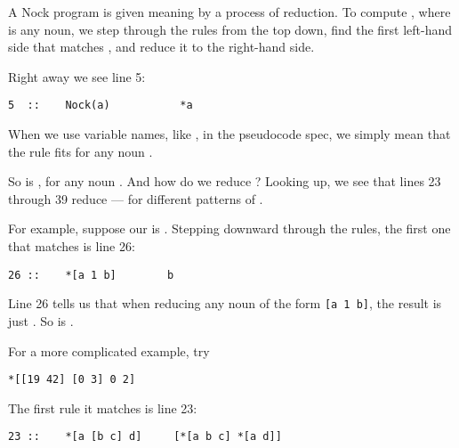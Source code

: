 A Nock program is given meaning by a process of reduction.  To compute
, where  is any noun, we step through the rules from
the top down, find the first left-hand side that matches , and
reduce it to the right-hand side.

Right away we see line 5:

\begin{framed_shaded}
\begin{Verbatim}[fontsize=\relsize{-2.5},fontseries=b,commandchars=\\\{\}]
5  ::    Nock(a)           *a
\end{Verbatim}
\end{framed_shaded}

When we use variable names, like , in the pseudocode spec, we
simply mean that the rule fits for any noun .

So  is , for any noun .  And how do we reduce
?  Looking up, we see that lines 23 through 39 reduce ---
for different patterns of .

For example, suppose our  is \kode{[5 1 6]}.  Stepping downward
through the rules, the first one that matches is line 26:

\begin{framed_shaded}
\begin{Verbatim}[fontsize=\relsize{-2.5},fontseries=b,commandchars=\\\{\}]
26 ::    *[a 1 b]        b
\end{Verbatim}
\end{framed_shaded}

Line 26 tells us that when reducing any noun of the form {\tt [a 1
b]}, the result is just .  So \kode{*[5 1 6]} is .

For a more complicated example, try

\begin{framed_shaded}
\begin{Verbatim}[fontsize=\relsize{-2.5},fontseries=b,commandchars=\\\{\}]
*[[19 42] [0 3] 0 2]
\end{Verbatim}
\end{framed_shaded}

The first rule it matches is line 23:

\begin{framed_shaded}
\begin{Verbatim}[fontsize=\relsize{-2.5},fontseries=b,commandchars=\\\{\}]
23 ::    *[a [b c] d]     [*[a b c] *[a d]]
\end{Verbatim}
\end{framed_shaded}

